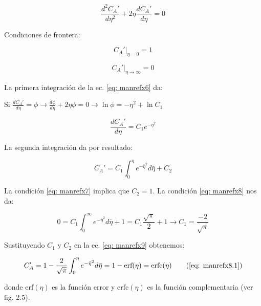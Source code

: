 \begin{equation} \label{eq: manrefx6}
	\frac{d^2 C_A'}{d \eta^2} + 2\eta \frac{d C_A'}{d \eta} = 0
\end{equation}

Condiciones de frontera:

\begin{equation} \label{eq: manrefx7}
	C_A'|_{\eta = 0} = 1
\end{equation}

\begin{equation} \label{eq: manrefx8}
	C_A'|_{\eta \to \infty} = 0
\end{equation}

La primera integración de la ec. \eqref{eq: manrefx6} da:

Si $\frac{d C_A'}{d \eta} = \phi \to \frac{d\phi}{d \eta} + 2 \eta \phi = 0 \to \ln{\phi} = -\eta^2 + \ln{C_1}$

\begin{equation} \label{eq: manrefx8.1}
	\frac{dC_A'}{d \eta} = C_1 e^{-\eta^2}
\end{equation}

La segunda integración da por resultado:

\begin{equation} \label{eq: manrefx9}
	C_A' = C_1 \int_0^\eta e^{-\bar{\eta}^2} d\bar{\eta} + C_2
\end{equation}

La condición \eqref{eq: manrefx7} implica que $C_2 = 1$. La condición \eqref{eq: manrefx8} nos da:

$$0 = C_1 \int_0^\infty e^{-\bar{\eta}^2} d\bar{\eta} +1 = C_1 \frac{\sqrt{\pi}}{2} + 1 \to C_1 = \frac{-2}{\sqrt{\pi}}$$

Sustituyendo $C_1$ y $C_2$ en la ec. \eqref{eq: manrefx9} obtenemos: 

\begin{equation}
C_A' = 1 - \frac{2}{\sqrt{\pi}} \int_0^\eta e^{-\bar{\eta}^2} d\bar{\eta} = 1 - \text{erf} (\eta) = \text{erfc}(\eta) 
\tag{\ref{eq: manrefx8.1}}
\end{equation}

 donde $\text{erf} (\eta)$ es la función error y $\text{erfc}(\eta)$ es la función complementaria (ver fig. 2.5).
 
